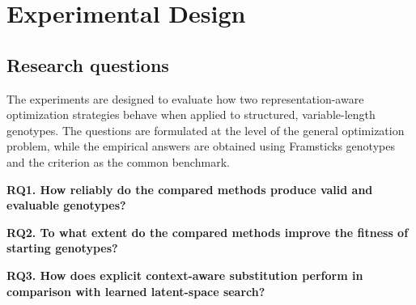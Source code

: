 \chapter{Experimental Design}

\section{Research questions}

The experiments are designed to evaluate how two representation-aware optimization strategies behave when applied to structured, variable-length genotypes. The questions are formulated at the level of the general optimization problem, while the empirical answers are obtained using Framsticks \fone{} genotypes and the \vertpos{} criterion as the common benchmark.

\textbf{RQ1. How reliably do the compared methods produce valid and evaluable genotypes?}


\textbf{RQ2. To what extent do the compared methods improve the fitness of starting genotypes?}


\textbf{RQ3. How does explicit context-aware substitution perform in comparison with learned latent-space search?}


